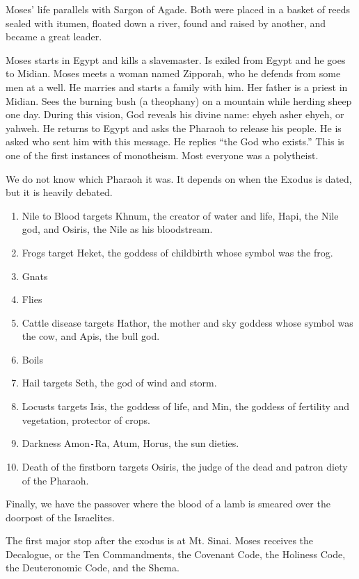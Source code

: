 \documentclass{article}
\begin{document}
    Moses' life parallels with Sargon of Agade. Both were placed in a basket of reeds sealed with itumen, floated down a river, found and raised by another, and became a great leader.

    Moses starts in Egypt and kills a slavemaster. Is exiled from Egypt and he goes to Midian. Moses meets a woman named Zipporah, who he defends from some men at a well. He marries and starts a family with him. Her father is a priest in Midian. Sees the burning bush (a theophany) on a mountain while herding sheep one day. During this vision, God reveals his divine name: ehyeh asher ehyeh, or yahweh. He returns to Egypt and asks the Pharaoh to release his people. He is asked who sent
    him with this message. He replies ``the God who exists.'' This is one of the first instances of monotheism. Most everyone was a polytheist.

    We do not know which Pharaoh it was. It depends on when the Exodus is dated, but it is heavily debated.

    \begin{enumerate}
        \item Nile to Blood targets Khnum, the creator of water and life, Hapi, the Nile god, and Osiris, the Nile as his bloodstream.
        \item Frogs target Heket, the goddess of childbirth whose symbol was the frog.
        \item Gnats
        \item Flies
        \item Cattle disease targets Hathor, the mother and sky goddess whose symbol was the cow, and Apis, the bull god.
        \item Boils
        \item Hail targets Seth, the god of wind and storm.
        \item Locusts targets Isis, the goddess of life, and Min, the goddess of fertility and vegetation, protector of crops.
        \item Darkness Amon\texttt{-}Ra, Atum, Horus, the sun dieties.
        \item Death of the firstborn targets Osiris, the judge of the dead and patron diety of the Pharaoh.
    \end{enumerate}

    Finally, we have the passover where the blood of a lamb is smeared over the doorpost of the Israelites.

    The first major stop after the exodus is at Mt. Sinai. Moses receives the Decalogue, or the Ten Commandments, the Covenant Code, the Holiness Code, the Deuteronomic Code, and the Shema.
\end{document}
